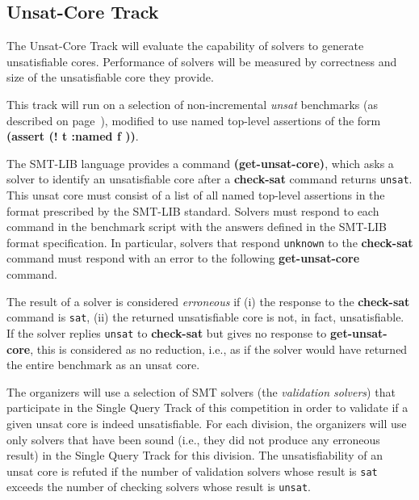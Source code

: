 \documentclass[12pt]{article}
\newcommand{\akey}[1]{\textbf{#1}\xspace}
\newcommand{\maintrack}{Single Query Track\xspace}
\newcommand{\inctrack}{Incremental Track\xspace}
\newcommand{\ucoretrack}{Unsat-Core Track\xspace}
\begin{document}


\subsection{\ucoretrack}
\label{sec:exec:unsat-core}

The \ucoretrack will evaluate the capability of solvers to generate
unsatisfiable cores.  Performance of solvers will be measured by correctness
and size of the unsatisfiable core they provide.

This track will run on a selection of non-incremental \emph{unsat} benchmarks
(as described on page~\pageref{benchmark-selection}), modified
to use named top-level assertions of the form \akey{(assert (! t :named f ))}.


The SMT-LIB language provides a command \akey{(get-unsat-core)}, which asks
a solver to identify an unsatisfiable core after a \akey{check-sat}
command returns \texttt{unsat}.
This unsat core must consist of a list of all named top-level
assertions in the format prescribed by the SMT-LIB standard.
%
Solvers must respond to each command in the benchmark script with the
answers defined in the SMT-LIB format specification.  In particular,
solvers that respond \texttt{unknown} to the \akey{check-sat} command
must respond with an error to the following \akey{get-unsat-core}
command.

The result of a solver is considered \emph{erroneous} if (i) the
response to the \akey{check-sat} command is \texttt{sat}, (ii) the
returned unsatisfiable core is not, in fact, unsatisfiable.
%
If the solver replies \texttt{unsat} to \akey{check-sat} but gives no
response to \akey{get-unsat-core}, this is considered as no reduction, i.e.,
as if the solver would have returned the entire benchmark as an unsat
core.

The organizers will use a selection of SMT solvers (the \emph{validation
solvers}) that participate in the \maintrack of this competition in order to
validate if a given unsat core is indeed unsatisfiable.  For each division, the
organizers will use only solvers that have been sound (i.e., they did not
produce any erroneous result) in the \maintrack for this division.  The
unsatisfiability of an unsat core is refuted if the number of validation
solvers whose result is \texttt{sat} exceeds the number of checking solvers
whose result is \texttt{unsat}.
\end{document}
